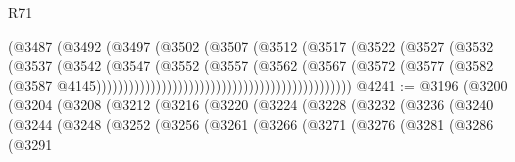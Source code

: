 \begin{lexlean}{R71}
\begin{coremodule}
                                                        (@3487
                                                          (@3492
                                                            (@3497
                                                              (@3502
                                                                (@3507
                                                                  (@3512
                                                                    (@3517
                                                                      (@3522
                                                                        (@3527
                                                                          (@3532
                                                                            (@3537
                                                                              (@3542
                                                                                (@3547
                                                                                  (@3552
                                                                                    (@3557
                                                                                      (@3562
                                                                                        (@3567
                                                                                          (@3572
                                                                                            (@3577
                                                                                              (@3582
                                                                                                (@3587
                                                                                                  @4145)))))))))))))))))))))))))))))))))))))))))))))))
@4241 := @3196
    (@3200
      (@3204
        (@3208
          (@3212
            (@3216
              (@3220
                (@3224
                  (@3228
                    (@3232
                      (@3236
                        (@3240
                          (@3244
                            (@3248
                              (@3252
                                (@3256
                                  (@3261
                                    (@3266
                                      (@3271
                                        (@3276
                                          (@3281
                                            (@3286
                                              (@3291

\end{coremodule}
\end{lexlean}
